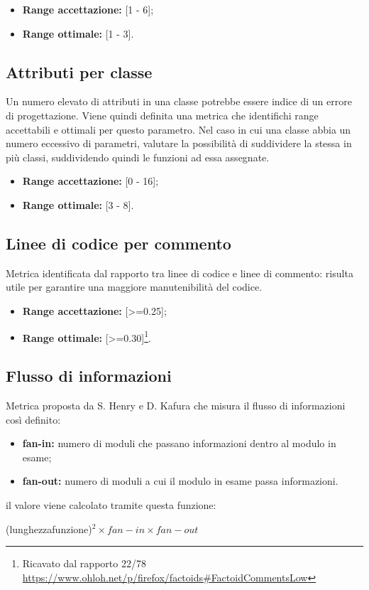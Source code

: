\begin{itemize}
	\item \textbf{Range accettazione:} [1 - 6];
	\item \textbf{Range ottimale:} [1 - 3].
\end{itemize}  


\subsection{Attributi per classe}
Un numero elevato di attributi in una classe potrebbe essere indice di un errore di progettazione.
Viene quindi definita una metrica che identifichi range accettabili e ottimali per questo parametro.
Nel caso in cui una classe abbia un numero eccessivo di parametri, valutare la possibilità di suddividere la stessa in più classi, suddividendo quindi le funzioni ad essa assegnate.

\begin{itemize}
	\item \textbf{Range accettazione:} [0 - 16];
	\item \textbf{Range ottimale:} [3 - 8].
\end{itemize}  

\subsection{Linee di codice per commento}
Metrica identificata dal rapporto tra linee di codice e linee di commento: risulta utile per garantire una maggiore manutenibilità del codice.

\begin{itemize}
	\item \textbf{Range accettazione:} [>=0.25];
	\item \textbf{Range ottimale:} [>=0.30]\footnote{Ricavato dal rapporto 22/78 \url{https://www.ohloh.net/p/firefox/factoids\#FactoidCommentsLow}}.
\end{itemize}  

\subsection{Flusso di informazioni}
Metrica proposta da S. Henry e D. Kafura che misura il flusso di informazioni così definito:

\begin{itemize}
	\item \textbf{fan-in:} numero di moduli che passano informazioni dentro al modulo in esame;
	\item \textbf{fan-out:} numero di moduli a cui il modulo in esame passa informazioni.
\end{itemize} 
il valore viene calcolato tramite questa funzione:
\begin{center}
(lunghezzafunzione)$^2\times fan-in\times fan-out$
\end{center}


